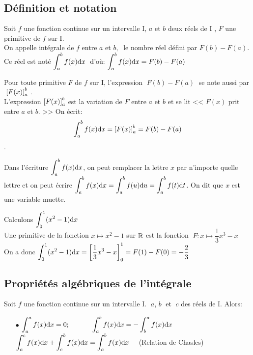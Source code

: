 \subsection{Définition et notation}
\begin{definition}
Soit $f$ une fonction continue sur un intervalle I, $ a $  et $ b $  deux réels de I , $F$ une primitive de $f$ sur I.\\
 On appelle intégrale de $f$ entre $ a $  et $ b,\; $  le nombre  réel défini par $F(b)-F(a) $.\\
 
Ce réel est noté $ \displaystyle\int_{a}^{b}f(x){\rm d}x \;$  d'où:
$ \displaystyle\int_{a}^{b}f(x){\rm d}x=F(b)-F(a) $

\end{definition}
\begin{notation}
 Pour toute primitive $F$  de $f$ sur I, l'expression $\; F(b)-F(a)\; $  se note aussi par  $\;\left[ F(x) \right]^{b}_{a} \; $.\\
  L'expression $\left[ F(x) \right]^{b}_{a} $   est la variation de $F$ entre  $ a $  et $ b $ et se lit << $ F(x) $   prit entre  $ a $  et $ b $. >> On écrit:
    $$  \displaystyle\int_{a}^{b}f(x){\rm d}x= \left[ F(x) \right]^{b}_{a}=F(b)-F(a) $$.
\end{notation}
 \begin{remark}
  Dans l'écriture  $ \displaystyle\int_{a}^{b}f(x){\rm d}x $, on peut remplacer la lettre $ x $ par n'importe quelle    lettre  et on peut écrire   $ \displaystyle\int_{a}^{b}f(x){\rm d}x  =  \displaystyle\int_{a}^{b}f(u){\rm d}u =  \displaystyle\int_{a}^{b}f(t){\rm d}t $. On dit que $ x $ est une variable muette.
 
  \end{remark}
 \begin{example}
Calculons $ \displaystyle\int_{0}^{1}(x^{2}-1){\rm d}x $\\
 Une primitive de la fonction  $ x\longmapsto x^{2}-1 $  sur $ \mathbb{R} $ est la fonction  $\; F:  x\longmapsto \dfrac{1}{3}x^{3}-x $\\ On a donc  $ \displaystyle\int_{0}^{1}(x^{2}-1){\rm d}x= \left[ \frac{1}{3}x^{3}- x \right]^{1}_{0}=F(1)-F(0) =-\frac{2}{3}$
 \end{example}
 
 \subsection{Propriétés algébriques de l'intégrale}
 \begin{property}
 Soit $f$ une fonction continue sur un intervalle I. $\; a $, $b \; $  et $ \; c $ des  réels de I. Alors:     \\
 \begin{itemize}
\item[$  \bullet$]  $ \displaystyle\int_{a}^{a}f(x){\rm d}x =0;\qquad \quad \; \displaystyle\int_{a}^{b}f(x){\rm d}x = -\displaystyle\int_{b}^{a}f(x){\rm d}x$
 \ite[$  \bullet$] $ \displaystyle\int_{a}^{c}f(x){\rm d}x +\displaystyle\int_{c}^{b}f(x){\rm d}x=\displaystyle\int_{a}^{b}f(x){\rm d}x\quad $ (Relation de Chasles)
  \end{itemize}
  \end{property}
 
